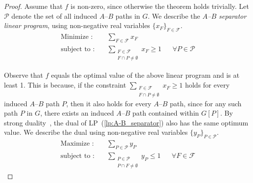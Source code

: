 \documentclass[11pt]{amsart}
\begin{document}
\begin{proof}
    Assume that $f$ is non-zero, since otherwise the theorem holds trivially.
    Let $\mathcal{P}$ denote the set of all induced $A$--$B$ paths in $G$. We describe the \emph{$A$--$B$ separator linear program}, using non-negative real variables $\{x_F\}_{F\in\mathcal{F}}$.
    \begin{align}\label{lp:A-B_separator}
        \text{Minimize :}&\quad \sum\limits_{F\in\mathcal{F}} x_{F}\\
        \nonumber \text{subject to :}&\quad \sum\limits_{\substack{F\in \mathcal{F}\\ F\cap P\neq \emptyset}} x_{F} \geq 1 && \forall P\in \mathcal{P}
    \end{align}
    
    Observe that $f$ equals the optimal value of the above linear program and is at least 1. This is because, if the constraint $\sum\limits_{\substack{F\in \mathcal{F}\\ F\cap P\neq \emptyset}} x_{F} \geq 1$ holds for every induced $A$--$B$ path $P$, then it also holds for every $A$--$B$ path, since for any such path $P$ in $G$, there exists an induced $A$--$B$ path contained within $G[P]$. By strong duality~\cite{doi:10.1137/1025101}, the dual of LP~(\ref{lp:A-B_separator}) also has the same optimum value. We describe the dual using non-negative real variables $\{y_P\}_{P\in\mathcal{P}}$. 
    \begin{align}\label{lp:path_packing}
        \text{Maximize :}&\quad \sum\limits_{P\in\mathcal{P}} y_{P}\\
        \nonumber \text{subject to :}&\quad \sum\limits_{\substack{P\in \mathcal{P}\\ P\cap F\neq \emptyset}} y_{P} \leq 1 && \forall F\in \mathcal{F}
    \end{align}
    

\end{proof}
\end{document}
